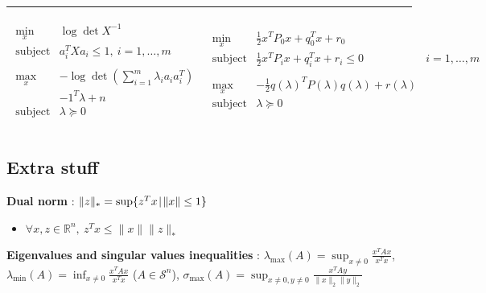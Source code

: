\documentclass[a4paper, 10pt]{article}
\newcommand{\rline}{\vspace{0em}\noindent\rule{\textwidth}{1pt}\vspace{0em}}
\newcommand{\norm}[1]{\|#1\|}
\newcommand{\set}[2]{\{ #1 \hspace{.1em} | \hspace{.1em}#2 \}}
\newcommand{\Rn}{\mathbb{R}^n}
\newcommand{\Sn}{\mathcal{S}^n}
\newcommand{\itm}[1]{{\color{itmcolor} \textbf{#1}}}
\begin{document}
\rline
\begin{equation*}
  \begin{array}{l|l}
    \begin{array}{ll}
      \underset{x}{\text{min}} & \log\det{X^{-1}}\\
      \text{subject to} & a_i^T X a_i \le 1,\ i = 1, \dots, m\\
                               & \\
      \underset{x}{\text{max}} & - \log \det(\sum_{i = 1}^m \lambda_i a_i a_i^T) \\
                               & - 1^T \lambda + n\\
      \text{subject to} & \lambda \succeq 0\\
    \end{array} &
                  \begin{array}{lll}
                    \underset{x}{\text{min}} & \frac{1}{2}x^T P_0 x + q_0^T x + r_0 &\\
                    \text{subject to} & \frac{1}{2}x^T P_i x + q_i^T x + r_i \le 0 & i = 1, \dots, m\\
                                             & & \\
                    \underset{x}{\text{max}} & - \frac{1}{2} q(\lambda)^T P(\lambda) q(\lambda) + r(\lambda) \\
                    \text{subject to} & \lambda \succeq 0\\
                  \end{array} \\
  \end{array}
\end{equation*}

\subsection{Extra stuff}

\itm{Dual norm} : $\norm{z}_* = \sup \set{z^T x}{\norm{x} \le 1}$
\begin{itemize}
\item $\forall x, z \in \Rn,\ z^T x \le \norm{x} \norm{z}_*$
\end{itemize}

\itm{Eigenvalues and singular values inequalities} : $\lambda_{\text{max}}(A) = \sup_{x \ne 0} \frac{x^T A x}{x^T x}$, $\lambda_{\text{min}}(A) = \inf_{x \ne 0} \frac{x^T A x}{x^T x}$ ($A \in \Sn$),
$\sigma_{\text{max}}(A) = \sup_{x \ne 0, y \ne 0} \frac{x^T A y}{\norm{x}_2 \norm{y}_2}$
\end{document}
